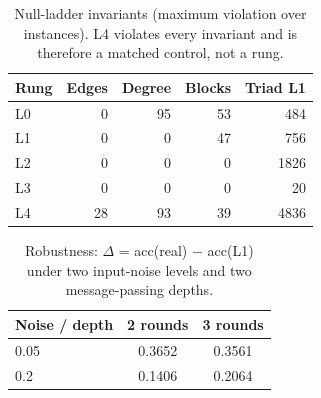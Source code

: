 
\begin{table}[t]\centering\caption{Main matrix, 10 frozen seeds. 
All real-minus-condition differences have 95\% bootstrap CIs excluding zero and BH $q=0.0002$. Chance $=0.5$.}\label{tab:main}\small
{}\end{table}

\begin{table}[t]\centering\caption{Null-ladder invariants (maximum violation over instances). 
L4 violates every invariant and is therefore a matched control, not a rung.}\label{tab:invariants}\small
\begin{tabular}{lrrrr}\toprule Rung & Edges & Degree & Blocks & Triad L1 \\ \midrule
L0 & 0 & 95 & 53 & 484 \\
L1 & 0 & 0 & 47 & 756 \\
L2 & 0 & 0 & 0 & 1826 \\
L3 & 0 & 0 & 0 & 20 \\
L4 & 28 & 93 & 39 & 4836 \\
\bottomrule\end{tabular}\end{table}

\begin{table}[t]\centering\caption{Robustness: $\Delta$ = acc(real) $-$ acc(L1) 
under two input-noise levels and two message-passing depths.}\label{tab:robust}\small
\begin{tabular}{lcc}\toprule Noise / depth & 2 rounds & 3 rounds \\ \midrule
0.05 & 0.3652 & 0.3561 \\
0.2 & 0.1406 & 0.2064 \\
\bottomrule\end{tabular}\end{table}
